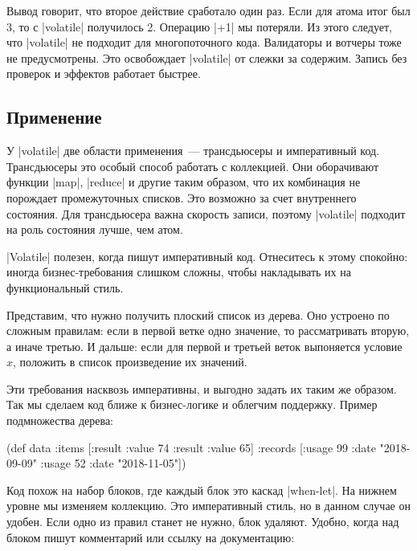 Вывод говорит, что второе действие сработало один раз. Если для атома итог был
3, то с \spverb|volatile| получилось 2. Операцию \spverb|+1| мы потеряли. Из
этого следует, что \spverb|volatile| не подходит для многопоточного
кода. Валидаторы и вотчеры тоже не предусмотрены. Это освобождает
\spverb|volatile| от слежки за содержим. Запись без проверок и эффектов работает
быстрее.

\subsection{Применение}

У \spverb|volatile| две области применения~--- трансдьюсеры и императивный
код. Трансдьюсеры это особый способ работать с коллекцией. Они оборачивают
функции \spverb|map|, \spverb|reduce| и другие таким образом, что их комбинация
не порождает промежуточных списков. Это возможно за счет внутреннего
состояния. Для трансдьюсера важна скорость записи, поэтому \spverb|volatile|
подходит на роль состояния лучше, чем атом.

\spverb|Volatile| полезен, когда пишут императивный код. Отнеситесь к этому
спокойно: иногда бизнес-требования слишком сложны, чтобы накладывать их на
функциональный стиль.

Представим, что нужно получить плоский список из дерева. Оно устроено по сложным
правилам: если в первой ветке одно значение, то рассматривать вторую, а иначе
третью. И дальше: если для первой и третьей веток выпоняется условие $x$,
положить в список произведение их значений.

Эти требования насквозь императивны, и выгодно задать их таким же образом. Так
мы сделаем код ближе к бизнес-логике и облегчим поддержку. Пример подмножества
дерева:

\begin{english}
  \begin{clojure}
(def data
  {:items [{:result {:value 74}}
           {:result {:value 65}}]
   :records [{:usage 99 :date "2018-09-09"}
             {:usage 52 :date "2018-11-05"}]})
  \end{clojure}
\end{english}

Код похож на набор блоков, где каждый блок это каскад \spverb|when-let|. На
нижнем уровне мы изменяем коллекцию. Это императивный стиль, но в данном случае
он удобен. Если одно из правил станет не нужно, блок удаляют. Удобно, когда над
блоком пишут комментарий или ссылку на документацию:


